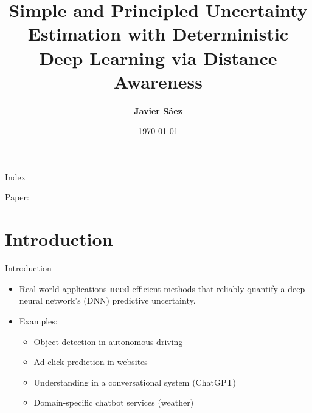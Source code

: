 \documentclass[xcolor=table]{beamer}
\begin{document}
\title{Simple and Principled Uncertainty Estimation with
Deterministic Deep Learning via Distance Awareness}
\author[Javier Sáez]{\textbf {Javier Sáez}} %
\date{\today}

\begin{frame}
    \maketitle
\end{frame}

\begin{frame}{Index}
    \tableofcontents

    Paper: \citep{sngp}
\end{frame}



\section{Introduction}

\begin{frame}{Introduction}
    \begin{itemize}
        \item Real world applications \textbf{need} efficient methods that reliably quantify a deep neural network's (DNN) predictive uncertainty.

        \pause

        \item Examples: 
        \begin{itemize}
            \item Object detection in autonomous driving
            \item Ad click prediction in websites
            \item Understanding in a conversational system (ChatGPT)
            \item Domain-specific chatbot services (weather)
        \end{itemize}

        
    \end{itemize}
\end{frame}
\end{document}
